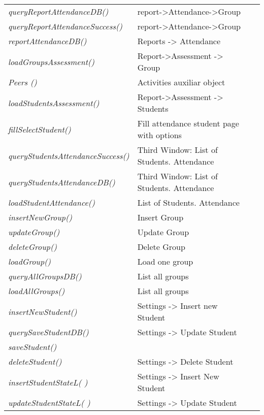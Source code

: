\begin{bclogo}[couleur=blue!30,arrondi=0.1, logo=\bcpanchant, barre=zigzag,  ombre=true ]
\begin{tabular}{lll}
\emph { queryReportAttendanceDB() }          & report->Attendance->Group \\
\emph { queryReportAttendanceSuccess()}     & report->Attendance->Group \\
\emph { reportAttendanceDB()  }              & {  Reports -> Attendance }\\
\emph { loadGroupsAssessment() }            & Report->Assessment ->  Group\\
\emph { Peers () }                          & Activities auxiliar object \\
\emph { loadStudentsAssessment() }      & Report->Assessment ->  Students\\
\emph {  fillSelectStudent() }          & {  Fill attendance student page with options } \\
\emph { queryStudentsAttendanceSuccess()}&    {   Third Window: List of Students.  Attendance }\\
\emph { queryStudentsAttendanceDB() }    & {  Third Window: List of Students.  Attendance }\\
\emph { loadStudentAttendance()  }      &  List of Students.  Attendance   \\
\emph { insertNewGroup()}               &{ Insert Group }   \\
\emph { updateGroup()  }                & {  Update Group  }\\
\emph { deleteGroup() }                 &{ Delete Group } \\
\emph { loadGroup()             }        & { Load  one group } \\
\emph { queryAllGroupsDB()      }        & { List all groups }  \\
\emph { loadAllGroups()         }        & {  List all groups }  \\
\emph { insertNewStudent() }            & { Settings -> Insert new Student  } \\
\emph { querySaveStudentDB() }          &  Settings -> Update Student \\
\emph { saveStudent() }                 & { } \\
\emph { deleteStudent()}                & { Settings -> Delete Student } \\
\emph { insertStudentStateL( ) }         & { Settings -> Insert New Student  }\\
\emph { updateStudentStateL( )  }        & { Settings ->  Update Student }\\



\end{tabular}

\end{bclogo}  



